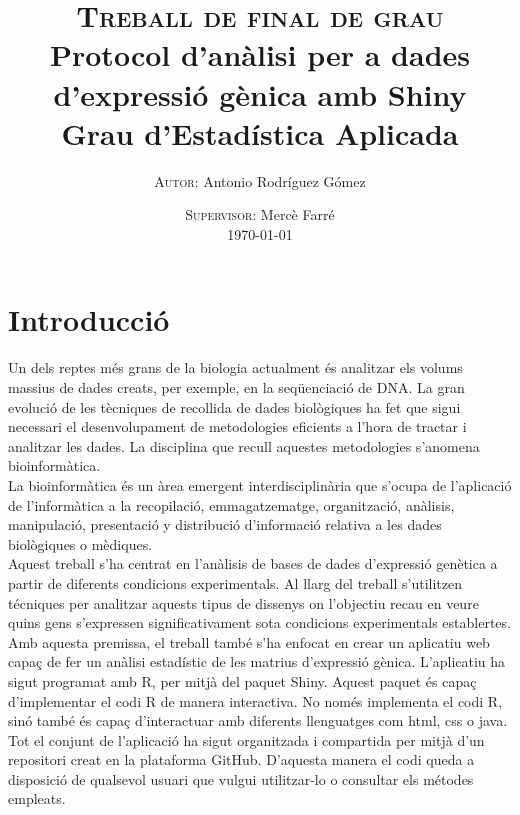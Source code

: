 \documentclass[english]{article}
\begin{document}
\title{
\textsc{Treball de final de grau}\\[2.6cm]
{\LARGE \bfseries Protocol d'anàlisi per a dades d'expressió gènica amb Shiny}\\{\Large\bfseries Grau d'Estadística Aplicada}\\[5cm]
}

\author{
\textsc{Autor:} Antonio Rodríguez Gómez
}

\date{
\textsc{Supervisor:} Mercè Farré \\[1em]
\today
}

\maketitle

\thispagestyle{empty}
\clearpage
\twocolumn[\makeAbstract]
\thispagestyle{empty}
\clearpage
\tableofcontents
\clearpage
\section{Introducció}
Un dels reptes més grans de la biologia actualment és analitzar els volums massius de dades creats, per exemple, en la seqüenciació de DNA. La gran evolució de les tècniques de recollida de dades biològiques ha fet que sigui necessari el desenvolupament de metodologies eficients a l'hora de tractar i analitzar les dades. La disciplina que recull aquestes metodologies s'anomena bioinformàtica.
\\

La bioinformàtica és un àrea emergent interdisciplinària que s'ocupa de l'aplicació de l'informàtica a la recopilació, emmagatzematge, organització, anàlisis, manipulació, presentació y distribució d'informació relativa a les dades biològiques o mèdiques.
\\

Aquest treball s'ha centrat en l'anàlisis de bases de dades d'expressió genètica a partir de diferents condicions experimentals. Al llarg del treball s'utilitzen técniques per analitzar aquests tipus de dissenys on l'objectiu recau en veure quins gens s'expressen significativament sota condicions experimentals establertes.
\\

Amb aquesta premissa, el treball també s'ha enfocat en crear un aplicatiu web capaç de fer un anàlisi estadístic de les matrius d'expressió gènica. L'aplicatiu ha sigut programat amb R, per mitjà del paquet Shiny. Aquest paquet és capa\c{c} d'implementar el codi R de manera interactiva. No només implementa el codi R, sinó també és capaç d'interactuar amb diferents llenguatges com html, css o java. Tot el conjunt de l'aplicació ha sigut organitzada i compartida per mitjà d'un repositori creat en la plataforma GitHub. D'aquesta manera el codi queda a disposició de qualsevol usuari que vulgui utilitzar-lo o consultar els métodes empleats.
\end{document}
